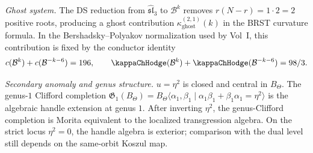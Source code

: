 \begin{computation}
\emph{Ghost system.}
The DS reduction from $\widehat{\mathfrak{sl}}_3$ to
$\mathcal B^k$ removes $r(N{-}r)=1\cdot 2=2$ positive roots,
producing a ghost contribution
\(\kappa_{\mathrm{ghost}}^{(2,1)}(k)\) in the BRST curvature
formula.  In the Bershadsky--Polyakov normalization used by Vol~I,
this contribution is fixed by the conductor identity
\[
c(\mathcal B^k)+c(\mathcal B^{-k-6})=196,
\qquad
\kappaChHodge(\mathcal B^k)+\kappaChHodge(\mathcal B^{-k-6})=98/3.
\]

\emph{Secondary anomaly and genus structure.}
$u=\eta^2$ is closed and central in $B_\Theta$. The
genus-$1$ Clifford completion
$\mathfrak G_1(B_\Theta)=B_\Theta\langle\alpha_1,\beta_1
\mid\alpha_1\beta_1+\beta_1\alpha_1=\eta^2\rangle$
is the algebraic handle extension at genus \(1\). After inverting
\(\eta^2\), the genus-Clifford completion is Morita equivalent to
the localized transgression algebra. On the strict locus
\(\eta^2=0\), the handle algebra is exterior; comparison with the
dual level still depends on the same-orbit Koszul map.
\end{computation}

